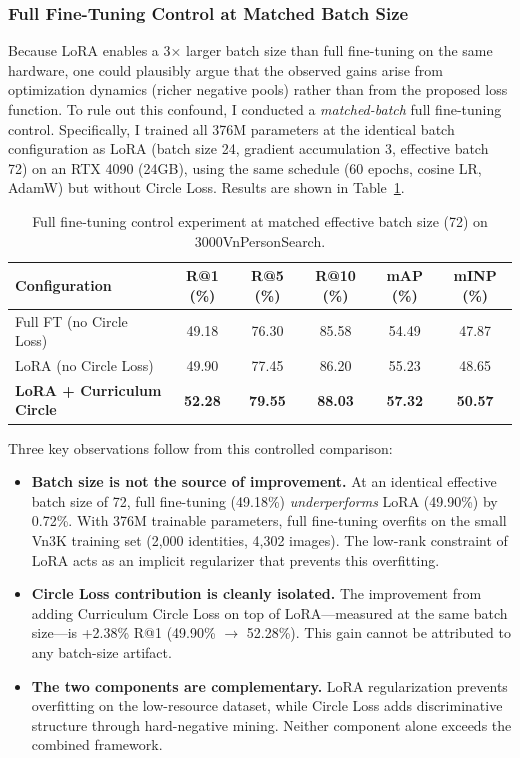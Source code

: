 \documentclass[../main.tex]{subfiles}
\begin{document}
\subsubsection{Full Fine-Tuning Control at Matched Batch Size}
\label{sec:ft_control}

\noindent Because LoRA enables a 3$\times$ larger batch size than full fine-tuning on the same hardware, one could plausibly argue that the observed gains arise from optimization dynamics (richer negative pools) rather than from the proposed loss function. To rule out this confound, I conducted a \textit{matched-batch} full fine-tuning control. Specifically, I trained all 376M parameters at the identical batch configuration as LoRA (batch size 24, gradient accumulation 3, effective batch 72) on an RTX 4090 (24GB), using the same schedule (60 epochs, cosine LR, AdamW) but without Circle Loss. Results are shown in Table~\ref{tab:ft_control}.

\begin{table}[htbp]
\centering
\caption{Full fine-tuning control experiment at matched effective batch size (72) on 3000VnPersonSearch.}
\label{tab:ft_control}
\renewcommand{\arraystretch}{1.3}
\begin{tabularx}{\textwidth}{Xccccc}
\toprule
\textbf{Configuration} & \textbf{R@1 (\%)} & \textbf{R@5 (\%)} & \textbf{R@10 (\%)} & \textbf{mAP (\%)} & \textbf{mINP (\%)} \\
\midrule
Full FT (no Circle Loss) & 49.18 & 76.30 & 85.58 & 54.49 & 47.87 \\
LoRA (no Circle Loss) & 49.90 & 77.45 & 86.20 & 55.23 & 48.65 \\
\textbf{LoRA + Curriculum Circle} & \textbf{52.28} & \textbf{79.55} & \textbf{88.03} & \textbf{57.32} & \textbf{50.57} \\
\bottomrule
\end{tabularx}
\end{table}

\noindent Three key observations follow from this controlled comparison:
\begin{itemize}
    \item \textbf{Batch size is not the source of improvement.} At an identical effective batch size of 72, full fine-tuning (49.18\%) \textit{underperforms} LoRA (49.90\%) by 0.72\%. With 376M trainable parameters, full fine-tuning overfits on the small Vn3K training set (2,000 identities, 4,302 images). The low-rank constraint of LoRA acts as an implicit regularizer that prevents this overfitting.
    \item \textbf{Circle Loss contribution is cleanly isolated.} The improvement from adding Curriculum Circle Loss on top of LoRA---measured at the same batch size---is +2.38\% R@1 (49.90\% $\to$ 52.28\%). This gain cannot be attributed to any batch-size artifact.
    \item \textbf{The two components are complementary.} LoRA regularization prevents overfitting on the low-resource dataset, while Circle Loss adds discriminative structure through hard-negative mining. Neither component alone exceeds the combined framework.
\end{itemize}
\end{document}
